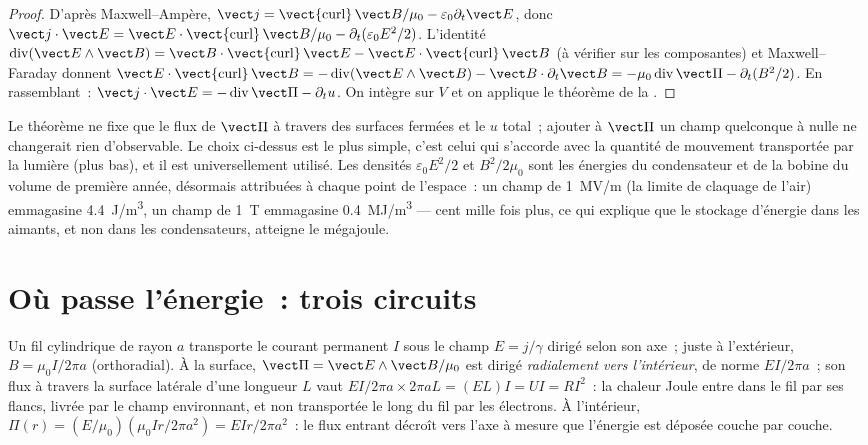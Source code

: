 \begin{proof}
D'après Maxwell--Ampère, $\vect j = \operatorname{\vect{curl}}\vect B/\mu_0 - \varepsilon_0\partial_t
\vect E$, donc $\vect j\cdot\vect E = \vect E\cdot\operatorname{\vect{curl}}\vect B/\mu_0 -
\partial_t(\varepsilon_0E^2/2)$. L'identité $\operatorname{div}(\vect E\wedge\vect B) = \vect B
\cdot\operatorname{\vect{curl}}\vect E - \vect E\cdot\operatorname{\vect{curl}}\vect B$ (à vérifier
sur les composantes) et Maxwell--Faraday donnent $\vect E\cdot\operatorname{\vect{curl}}
\vect B = -\operatorname{div}(\vect E\wedge\vect B) - \vect B\cdot\partial_t\vect B = -\mu_0
\operatorname{div}\vect\Pi - \partial_t(B^2/2)$. En rassemblant~: $\vect j\cdot\vect E = -\operatorname{div}
\vect\Pi - \partial_tu$. On intègre sur $V$ et on applique le théorème de la .
\end{proof}

\begin{remark}\label{rem:b2:poynting-vector:interpretation}
Le théorème ne fixe que le flux de $\vect\Pi$ à travers des surfaces fermées
et le $u$ total~; ajouter à $\vect\Pi$ un champ quelconque à  nulle ne
changerait rien d'observable. Le choix ci-dessus est le plus simple, c'est
celui qui s'accorde avec la quantité de mouvement transportée par la lumière (plus bas), et il est
universellement utilisé. Les densités $\varepsilon_0E^2/2$ et $B^2/2\mu_0$ sont les
énergies du condensateur et de la bobine du volume de première année,
désormais attribuées à chaque point de l'espace~: un champ de \qty{1}{MV/m} (la
limite de claquage de l'air) emmagasine \qty{4.4}{J/m^3}, un champ de \qty{1}{T}
emmagasine \qty{0.4}{MJ/m^3} --- cent mille fois plus, ce qui explique que le
stockage d'énergie dans les aimants, et non dans les condensateurs, atteigne le mégajoule.
\end{remark}

\section{Où passe l'énergie~: trois circuits}

\begin{example}\label{ex:b2:poynting-vector:wire}
Un fil cylindrique de rayon $a$ transporte le courant permanent $I$ sous le
champ $E = j/\gamma$ dirigé selon son axe~; juste à l'extérieur, $B = \mu_0I/2\pi a$
(orthoradial). À la surface, $\vect\Pi = \vect E\wedge\vect B/\mu_0$ est dirigé
\emph{radialement vers l'intérieur}, de norme $EI/2\pi a$~; son flux à travers la
surface latérale d'une longueur $L$ vaut $EI/2\pi a\times2\pi aL = (EL)I = UI =
RI^2$~: la chaleur Joule entre dans le fil par ses flancs, livrée par
le champ environnant, et non transportée le long du fil par les électrons.
À l'intérieur, $\Pi(r) = (E/\mu_0)(\mu_0Ir/2\pi a^2) = EIr/2\pi a^2$~: le flux entrant
décroît vers l'axe à mesure que l'énergie est déposée couche par couche.
\end{example}


